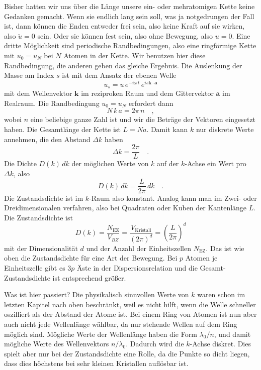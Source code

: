 Bisher hatten wir uns über die Länge unsere ein- oder mehratomigen Kette keine Gedanken gemacht. Wenn sie endlich lang sein soll, was ja notgedrungen der Fall ist, dann können die Enden entweder frei sein, also keine Kraft auf sie wirken, also $\ddot{u} = 0$ sein. Oder sie können fest sein, also ohne Bewegung, also $u=0$. Eine dritte Möglichkeit sind periodische Randbedingungen, also eine ringförmige Kette mit $u_0 = u_N$ bei $N$ Atomen in der Kette. Wir benutzen hier diese Randbedingung, die anderen geben das gleiche Ergebnis. Die Auslenkung der Masse am Index $s$ ist mit dem Ansatz der ebenen Welle
\begin{equation}
 u_s = u \, e^{- i \omega \, t} \, e^{i s \mathbf{k} \cdot \mathbf{a}}
\end{equation}
mit dem Wellenvektor $\mathbf{k} $ im reziproken Raum und dem Gittervektor $\mathbf{a}$ im  Realraum. Die Randbedingung $u_0 = u_N$ erfordert dann
\begin{equation}
 N \, k \, a = 2 \pi \, n \quad ,
\end{equation}
wobei $n$ eine beliebige ganze Zahl ist und wir die Beträge der Vektoren eingesetzt haben.
Die Gesamtlänge der Kette ist $L = N a$. Damit kann $k$ nur diskrete Werte annehmen, die den Abstand $\Delta k$ haben
\begin{equation}
\Delta  k = \frac{2 \pi }{L}  \quad .
\end{equation}
Die Dichte $ D(k) \, dk$ der möglichen Werte von $k$ auf der $k$-Achse ein Wert pro $\Delta k$, also
\begin{equation}
 D(k) \, dk = \frac{L}{2 \pi} \, dk  \quad .
\end{equation}
Die Zustandsdichte ist im $k$-Raum also konstant.
Analog kann man im Zwei- oder Dreidimensionalen verfahren, also bei Quadraten oder Kuben der Kantenlänge $L$. Die Zustandsdichte ist
\begin{equation}
D(k) = \frac{N_\text{EZ}}{V_{BZ}}  = 
\frac{V_\text{Kristall}} {(2 \pi)^d} =
 \left(\frac{L}{2 \pi} \right)^d 
\end{equation}
mit der Dimensionalität $d$ und der Anzahl der Einheitszellen $N_\text{EZ}$. Das ist wie oben die Zustandsdichte für eine Art der Bewegung. Bei $p$ Atomen je Einheitszelle gibt es $3p$ Äste in der Dispersionsrelation und die Gesamt-Zustandsdichte ist entsprechend größer.

Was ist hier passiert? Die physikalisch sinnvollen Werte von $k$ waren schon im letzten Kapitel nach oben beschränkt, weil es nicht hilft, wenn die Welle schneller oszilliert als der Abstand der Atome ist. Bei einem Ring von Atomen ist nun aber auch nicht jede Wellenlänge wählbar, da nur stehende Wellen auf dem Ring möglich sind. Mögliche Werte der Wellenlänge haben die Form $\lambda_0 / n$, und damit mögliche Werte des Wellenvektors $n / \lambda_0$. Dadurch wird die $k$-Achse diskret. Dies spielt aber nur bei der Zustandsdichte eine Rolle, da die Punkte so dicht liegen, dass dies höchstens bei sehr kleinen Kristallen auflösbar ist.

